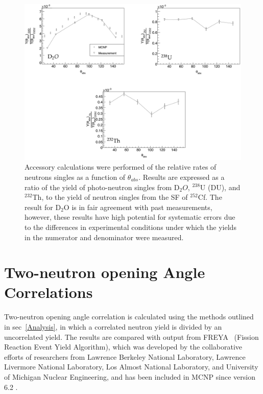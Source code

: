 \begin{figure}
    \includegraphics[width = 1\textwidth]{Content/Results/Singles.png}
    \caption{Accessory calculations were performed of the relative rates of neutrons singles as a function of $\theta_{abs}$. 
    Results are expressed as a ratio of the yield of photo-neutron singles from D$_{2}O$, $^{238}$U (DU), and $^{232}$Th, to the yield of neutron singles from the SF of $^{252}$Cf.
   The result for D$_{2}$O is in fair agreement with past measurements, however, these results have high potential for systematic errors due to the differences in experimental conditions under which the yields in the numerator and denominator were measured.
       }
    \label{fig:Singles}
\end{figure}

\FloatBarrier
\section{Two-neutron opening Angle Correlations}
Two-neutron opening angle correlation is calculated using the methods outlined in sec~\ref{Analysis}, in which a correlated neutron yield is divided by an uncorrelated yield.
The results are compared with output from FREYA~\cite{FREYA} (Fission Reaction Event Yield Algorithm), which was developed by the collaborative efforts of researchers from Lawrence Berkeley National Laboratory,  Lawrence Livermore National Laboratory, Los Almost National Laboratory, and University of Michigan Nuclear Engineering, and has been included in MCNP since version 6.2 .
 
